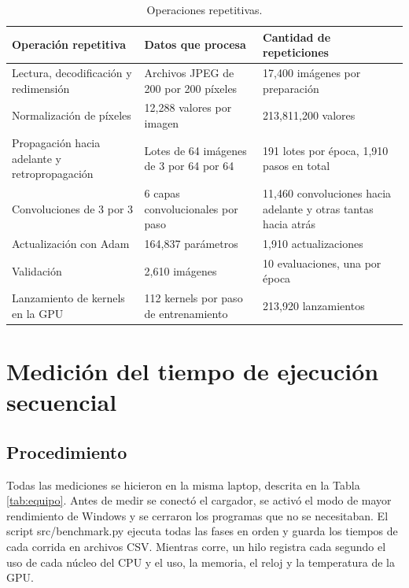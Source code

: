 \documentclass[11pt,letterpaper]{article}
\begin{document}
\begin{table}[H]
\centering
\small
\caption{Operaciones repetitivas.}
\label{tab:repetitivas}
\begin{tabular}{L{4.6cm}L{5.4cm}L{5.4cm}}
\toprule
Operación repetitiva & Datos que procesa & Cantidad de repeticiones \\
\midrule
Lectura, decodificación y redimensión & Archivos JPEG de 200 por 200 píxeles & 17,400 imágenes por preparación \\
Normalización de píxeles & 12,288 valores por imagen & 213,811,200 valores \\
Propagación hacia adelante y retropropagación & Lotes de 64 imágenes de 3 por 64 por 64 & 191 lotes por época, 1,910 pasos en total \\
Convoluciones de 3 por 3 & 6 capas convolucionales por paso & 11,460 convoluciones hacia adelante y otras tantas hacia atrás \\
Actualización con Adam & 164,837 parámetros & 1,910 actualizaciones \\
Validación & 2,610 imágenes & 10 evaluaciones, una por época \\
Lanzamiento de kernels en la GPU & 112 kernels por paso de entrenamiento & 213,920 lanzamientos \\
\bottomrule
\end{tabular}
\end{table}

\section{Medición del tiempo de ejecución secuencial}

\subsection{Procedimiento}
Todas las mediciones se hicieron en la misma laptop, descrita en la Tabla \ref{tab:equipo}. Antes de medir se conectó el cargador, se activó el modo de mayor rendimiento de Windows y se cerraron los programas que no se necesitaban. El script src/benchmark.py ejecuta todas las fases en orden y guarda los tiempos de cada corrida en archivos CSV. Mientras corre, un hilo registra cada segundo el uso de cada núcleo del CPU y el uso, la memoria, el reloj y la temperatura de la GPU.
\end{document}

